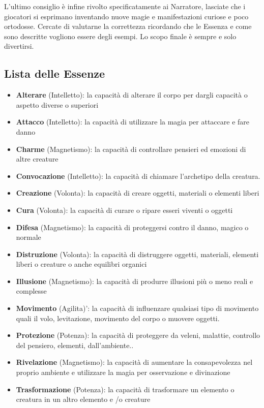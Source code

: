 \documentclass[a4paper,11pt,twoside,openany]{book}
\begin{document}
L'ultimo consiglio è infine rivolto specificatamente ai Narratore, lasciate che i giocatori si esprimano inventando nuove magie e manifestazioni curiose e poco ortodosse. Cercate di valutarne la correttezza ricordando che le Essenza e come sono descritte vogliono essere degli esempi. Lo scopo finale è sempre e solo divertirsi.

\subsection{Lista delle Essenze}

\begin{itemize}

	\item
	      \textbf{Alterare} (Intelletto): la capacità di alterare il corpo per dargli capacità o aspetto diverse o superiori
	\item
	      \textbf{Attacco} (Intelletto): la capacità di utilizzare la magia per attaccare e fare danno
	\item
	      \textbf{Charme} (Magnetismo): la capacità di controllare pensieri
	      ed emozioni di altre creature
	\item
	      \textbf{Convocazione} (Intelletto): la capacità di chiamare l'archetipo
	      della creatura.
	\item
	      \textbf{Creazione} (Volonta): la capacità di creare oggetti, materiali o elementi liberi
	\item
	      \textbf{Cura} (Volonta): la capacità di curare o ripare esseri viventi o oggetti
	\item
	      \textbf{Difesa} (Magnetismo): la capacità di proteggersi contro il danno, magico o normale
	\item
	      \textbf{Distruzione} (Volonta): la capacità di distruggere oggetti, materiali, elementi liberi o creature o anche equilibri organici
	\item
	      \textbf{Illusione} (Magnetismo): la capacità di produrre illusioni più o meno reali e complesse
	\item
	      \textbf{Movimento} (Agilita)': la capacità di influenzare qualsiasi tipo di movimento quali il volo, levitazione, movimento del corpo o muovere oggetti.
	\item
	      \textbf{Protezione} (Potenza): la capacità di proteggere da veleni, malattie, controllo del pensiero, elementi, dall'ambiente..
	\item
	      \textbf{Rivelazione} (Magnetismo): la capacità di aumentare la consapevolezza nel proprio ambiente e utilizzare la magia per osservazione e divinazione
	\item
	      \textbf{Trasformazione} (Potenza): la capacità di trasformare un elemento o creatura in un altro elemento e /o creature

\end{itemize}
\end{document}
